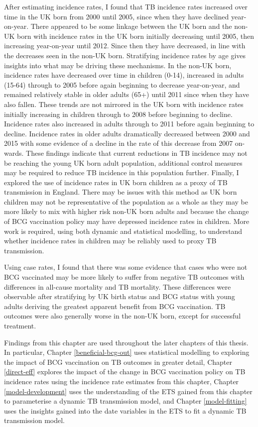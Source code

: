 \documentclass[11pt,twoside]{bristolthesis}
\begin{document}
  After estimating incidence rates, I found that TB incidence rates increased over time in the UK born from 2000 until 2005, since when they have declined year-on-year. There appeared to be some linkage between the UK born and the non-UK born with incidence rates in the UK born initially decreasing until 2005, then increasing year-on-year until 2012. Since then they have decreased, in line with the decreases seen in the non-UK born. Stratifying incidence rates by age gives insights into what may be driving these mechanisms. In the non-UK born, incidence rates have decreased over time in children (0-14), increased in adults (15-64) through to 2005 before again beginning to decrease year-on-year, and remained relatively stable in older adults (65+) until 2011 since when they have also fallen. These trends are not mirrored in the UK born with incidence rates initially increasing in children through to 2008 before beginning to decline. Incidence rates also increased in adults through to 2011 before again beginning to decline. Incidence rates in older adults dramatically decreased between 2000 and 2015 with some evidence of a decline in the rate of this decrease from 2007 on-wards. These findings indicate that current reductions in TB incidence may not be reaching the young UK born adult population, additional control measures may be required to reduce TB incidence in this population further. Finally, I explored the use of incidence rates in UK born children as a proxy of TB transmission in England. There may be issues with this method as UK born children may not be representative of the population as a whole as they may be more likely to mix with higher risk non-UK born adults and because the change of BCG vaccination policy may have depressed incidence rates in children. More work is required, using both dynamic and statistical modelling, to understand whether incidence rates in children may be reliably used to proxy TB transmission.
  
  Using case rates, I found that there was some evidence that cases who were not BCG vaccinated may be more likely to suffer from negative TB outcomes with differences in all-cause mortality and TB mortality. These differences were observable after stratifying by UK birth status and BCG status with young adults deriving the greatest apparent benefit from BCG vaccination. TB outcomes were also generally worse in the non-UK born, except for successful treatment.
  
  Findings from this chapter are used throughout the later chapters of this thesis. In particular, Chapter \ref{beneficial-bcg-out} uses statistical modelling to exploring the impact of BCG vaccination on TB outcomes in greater detail, Chapter \ref{direct-eff} explores the impact of the change in BCG vaccination policy on TB incidence rates using the incidence rate estimates from this chapter, Chapter \ref{model-development} uses the understanding of the ETS gained from this chapter to parameterise a dynamic TB transmission model, and Chapter \ref{model-fitting} uses the insights gained into the date variables in the ETS to fit a dynamic TB transmission model.
  
\end{document}
